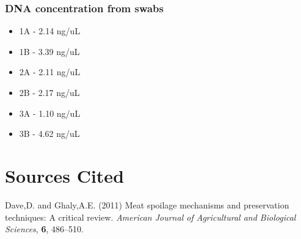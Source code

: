 \documentclass[]{article}
\providecommand{\tightlist}{%
  \setlength{\itemsep}{0pt}\setlength{\parskip}{0pt}}
\begin{document}
\hypertarget{dna-concentration-from-swabs}{%
\subsubsection{DNA concentration from
swabs}\label{dna-concentration-from-swabs}}

\begin{itemize}
\tightlist
\item
  1A - 2.14 ng/uL
\item
  1B - 3.39 ng/uL
\item
  2A - 2.11 ng/uL
\item
  2B - 2.17 ng/uL
\item
  3A - 1.10 ng/uL
\item
  3B - 4.62 ng/uL
\end{itemize}

\hypertarget{sources-cited}{%
\section*{Sources Cited}\label{sources-cited}}

\hypertarget{refs}{}
\leavevmode\hypertarget{ref-dave2011meat}{}%
Dave,D. and Ghaly,A.E. (2011) Meat spoilage mechanisms and preservation
techniques: A critical review. \emph{American Journal of Agricultural
and Biological Sciences}, \textbf{6}, 486--510.
\end{document}
